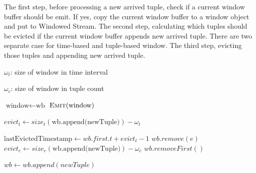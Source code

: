 \begin{algorithm}
\caption{Process new arrived tuple}
\label{algorithm:processNewTuple}
The first step, before processing a new arrived tuple, check if a current window buffer should be emit. If yes, copy the current window buffer to a window object and put to Windowed Stream. The second step, calculating which tuples should be evicted if the current window buffer appends new arrived tuple. There are two separate case for time-based and tuple-based window. The third step, evicting those tuples and appending new arrived tuple.


\algrenewcommand{}
\algrenewcommand{}
  \begin{algorithmic}[1]
  	
  			{$\omega_t$: size of window in time interval }
  			
  			{$\omega_c$: size of window in tuple count }
    
     
    		\State $\textrm{window} \gets \textrm{wb}$
    		\State $\textsc{Emit}(\textrm{window})$ 
    \EndIf
    
    		\State $ evict_t \gets size_t (\textrm{wb.append(newTuple)}) - \omega_t$
    
    		 
    			\State $ \textrm{lastEvictedTimestamp} \gets wb.first.t + evict_t - 1$
    					\State $wb.remove(e)$
    				\EndIf
    			\EndFor
    		\EndIf
    \Else {}
    		\State $evict_c \gets size_c(\textrm{wb.append(newTuple)}) - \omega_c$
    		 
    				\State $wb.removeFirst()$
    			\EndFor
    		\EndIf
    \EndIf
    
   	\State $wb \gets wb.append(newTuple)$ 
    
    
    \EndProcedure
  \end{algorithmic}
  




\end{algorithm}


